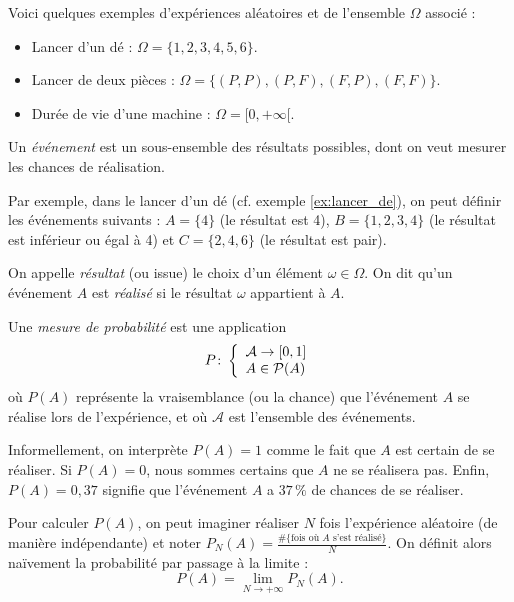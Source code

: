 \begin{exemple} 
    Voici quelques exemples d'expériences aléatoires et de l'ensemble $\Omega$ associé :
    \begin{itemize}
        \item Lancer d'un dé : $\Omega=\{1,2,3,4,5,6\}$. \label{ex:lancer_de}
        \item Lancer de deux pièces : $\Omega= \{(P,P),(P,F),(F,P),(F,F)\}$.
        \item Durée de vie d'une machine : $\Omega = [0,+\infty[$.
    \end{itemize} 
\end{exemple}

\begin{definition}
    Un \emph{événement} est un sous-ensemble des résultats possibles, dont on veut mesurer les chances de réalisation.
\end{definition}

Par exemple, dans le lancer d'un dé (cf. exemple \ref{ex:lancer_de}), on peut définir les événements suivants : $A= \{4\}$ (le résultat est 4), $B= \{1,2,3,4\}$ (le résultat est inférieur ou égal à 4) et $C= \{2,4,6\}$ (le résultat est pair).

\begin{definition}
    On appelle \emph{résultat} (ou issue) le choix d'un élément $\omega\in\Omega$. On dit qu'un événement $A$ est \emph{réalisé} si le résultat $\omega$ appartient à $A$.
\end{definition}

\begin{definition}
    Une \emph{mesure de probabilité} est une application 
    \[
    P\colon \left\{\begin{array}{l}\mathcal{A}\to [0,1] \\A \in \mathcal{P} (A)\end{array}\right.
    \]
    où $P(A)$ représente la vraisemblance (ou la chance) que l'événement $A$ se réalise lors de l'expérience, et où $\mathcal{A}$ est l'ensemble des événements.
\end{definition}

Informellement, on interprète $P(A)= 1$ comme le fait que $A$ est certain de se réaliser. Si $P(A)=0$, nous sommes certains que $A$ ne se réalisera pas. Enfin, $P(A)= 0{,}37$ signifie que l'événement $A$ a $37\,\%$ de chances de se réaliser.

Pour calculer $P(A)$, on peut imaginer réaliser $N$ fois l'expérience aléatoire (de manière indépendante) et noter $P_N(A) = \frac{\#\{\text{fois où } A \text{ s'est réalisé}\}}{N}$. On définit alors naïvement la probabilité par passage à la limite :
\[
P(A)= \lim_{N\to +\infty}P_N(A).
\]

